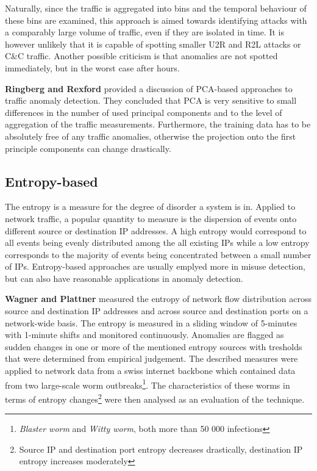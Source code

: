 \documentclass[a4paper,12pt,twoside]{report}
\begin{document}
Naturally, since the traffic is aggregated into bins and the temporal behaviour of these bins are examined, this approach is aimed towards identifying attacks with a comparably large volume of traffic, even if they are isolated in time. It is however unlikely that it is capable of spotting smaller U2R and R2L attacks or C\&C traffic. Another possible criticism is that anomalies are not spotted immediately, but in the worst case after hours.


\textbf{Ringberg and Rexford} \cite{ringberg_sensitivity_2007} provided a discussion of PCA-based approaches to traffic anomaly detection. They concluded that PCA is very sensitive to small differences in the number of used principal components and to the level of aggregation of the traffic measurements. Furthermore, the training data has to be absolutely free of any traffic anomalies, otherwise the projection onto the first principle components can change drastically. 

\subsection{Entropy-based}

The entropy is a measure for the degree of disorder a system is in. Applied to network traffic, a popular quantity to measure is the dispersion of events onto different source or destination IP addresses. A high entropy would correspond to all events being evenly distributed among the all existing IPs while a low entropy corresponds to the majority of events being concentrated between a small number of IPs.  Entropy-based approaches are usually emplyed more in misuse detection, but can also have reasonable applications in anomaly detection.

\textbf{Wagner and Plattner} \cite{wagner2005entropy} measured the entropy of network flow distribution across source and destination IP addresses and across source and destination ports on a network-wide basis. The entropy is measured in a sliding window of 5-minutes with 1-minute shifts and monitored continuously. Anomalies are flagged as sudden changes in one or more of the mentioned entropy sources with tresholds that were determined from empirical judgement. The described measures were applied to network data from a swiss internet backbone which contained data from two large-scale worm outbreaks\footnote{\textit{Blaster worm} and \textit{Witty worm}, both more than 50 000 infections}. The characteristics of these worms in terms of entropy changes\footnote{Source IP and destination port entropy decreases drastically, destination IP entropy increases moderately} were then analysed as an evaluation of the technique.
\end{document}
